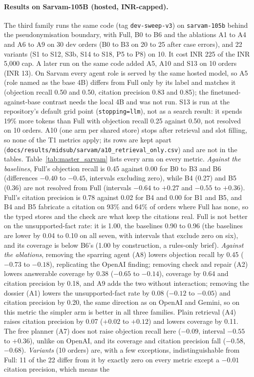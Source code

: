 \paragraph{Results on Sarvam-105B (hosted, INR-capped).}    The third family runs the same code (tag \texttt{dev-sweep-v3}) on \texttt{sarvam-105b} behind the pseudonymisation boundary, with Full, B0 to B6 and the ablations A1 to A4 and A6 to A9 on 30 dev orders (B0 to B3 on 20 to 25 after case errors), and 22 variants (S1 to S12, S3b, S14 to S18, P5 to P8) on 10. It cost INR 225 of the INR 5{,}000 cap. A later run on the same code added A5, A10 and S13 on 10 orders (INR 13). On Sarvam every agent role is served by the same hosted model, so A5 (role named as the base 4B) differs from Full only by its label and matches it (objection recall 0.50 and 0.50, citation precision 0.83 and 0.85); the finetuned-against-base contrast needs the local 4B and was not run. S13 is run at the repository's default grid point (\texttt{stopping=llm}), not as a search result: it spends 19\% more tokens than Full with objection recall 0.25 against 0.50, not resolved on 10 orders. A10 (one arm per shared store) stops after retrieval and slot filling, so none of the T1 metrics apply; its rows are kept apart (\texttt{docs/results/midsub/sarvam/a10\_retrieval\_only.csv}) and are not in the tables. Table~\ref{tab:master_sarvam} lists every arm on every metric. \emph{Against the baselines}, Full's objection recall is 0.45 against 0.00 for B0 to B3 and B6 (differences $-0.40$ to $-0.45$, intervals excluding zero), while B4 (0.27) and B5 (0.36) are not resolved from Full (intervals $-0.64$ to $+0.27$ and $-0.55$ to $+0.36$). Full's citation precision is 0.78 against 0.02 for B4 and 0.00 for B1 and B5, and B4 and B5 fabricate a citation on 93\% and 64\% of orders where Full has none, so the typed stores and the check are what keep the citations real. Full is not better on the unsupported-fact rate: it is 1.00, the baselines 0.90 to 0.96 (the baselines are lower by 0.04 to 0.10 on all seven, with intervals that exclude zero on six), and its coverage is below B6's (1.00 by construction, a rules-only brief). \emph{Against the ablations}, removing the sparring agent (A8) lowers objection recall by 0.45 ($-0.73$ to $-0.18$), replicating the OpenAI finding; removing check and repair (A2) lowers answerable coverage by 0.38 ($-0.65$ to $-0.14$), coverage by 0.64 and citation precision by 0.18, and A9 adds the two without interaction; removing the dossier (A1) lowers the unsupported-fact rate by 0.08 ($-0.12$ to $-0.05$) and citation precision by 0.20, the same direction as on OpenAI and Gemini, so on this metric the simpler arm is better in all three families. Plain retrieval (A4) raises citation precision by 0.07 ($+0.02$ to $+0.12$) and lowers coverage by 0.11. The free planner (A7) does not raise objection recall here ($-0.09$, interval $-0.55$ to $+0.36$), unlike on OpenAI, and its coverage and citation precision fall ($-0.58$, $-0.68$). \emph{Variants} (10 orders) are, with a few exceptions, indistinguishable from Full: 11 of the 22 differ from it by exactly zero on every metric except a $-0.01$ citation precision, which means the 